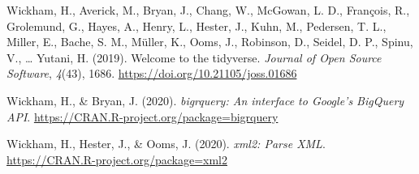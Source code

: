 \documentclass[a4paper,man,floatsintext,longtable,noextraspace,12pt]{apa6}
\newenvironment{CSLReferences}%
  {}%
  {\par}
\begin{document}
\begin{CSLReferences}{1}{0}
\leavevmode\hypertarget{ref-tidyverse}{}%
Wickham, H., Averick, M., Bryan, J., Chang, W., McGowan, L. D.,
François, R., Grolemund, G., Hayes, A., Henry, L., Hester, J., Kuhn, M.,
Pedersen, T. L., Miller, E., Bache, S. M., Müller, K., Ooms, J.,
Robinson, D., Seidel, D. P., Spinu, V., \ldots{} Yutani, H. (2019).
Welcome to the {tidyverse}. \emph{Journal of Open Source Software},
\emph{4}(43), 1686. \url{https://doi.org/10.21105/joss.01686}

\leavevmode\hypertarget{ref-bigrquery}{}%
Wickham, H., \& Bryan, J. (2020). \emph{{bigrquery}: An interface to
{Google's BigQuery API}}.
\url{https://CRAN.R-project.org/package=bigrquery}

\leavevmode\hypertarget{ref-xml2}{}%
Wickham, H., Hester, J., \& Ooms, J. (2020). \emph{{xml2}: Parse {XML}}.
\url{https://CRAN.R-project.org/package=xml2}

\end{CSLReferences}
\end{document}

